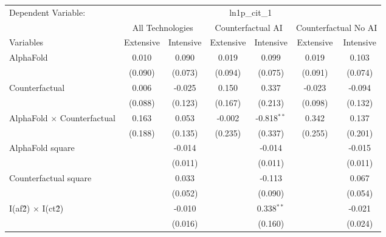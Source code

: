 \begingroup
\centering
\begin{tabular}{lcccccc}
   \tabularnewline \midrule \midrule
   Dependent Variable: & \multicolumn{6}{c}{ln1p\_cit\_1}\\
 & \multicolumn{2}{c}{All Technologies} & \multicolumn{2}{c}{Counterfactual AI} & \multicolumn{2}{c}{Counterfactual No AI} \\
\cmidrule(lr){1-1}\cmidrule(lr){2-3} \cmidrule(lr){4-5} \cmidrule(lr){6-7}
Variables & \multicolumn{1}{c}{Extensive} & \multicolumn{1}{c}{Intensive} & \multicolumn{1}{c}{Extensive} & \multicolumn{1}{c}{Intensive} & \multicolumn{1}{c}{Extensive} & \multicolumn{1}{c}{Intensive} \\
\cmidrule(lr){1-1}\cmidrule(lr){2-2} \cmidrule(lr){3-3} \cmidrule(lr){4-4} \cmidrule(lr){5-5} \cmidrule(lr){6-6} \cmidrule(lr){7-7}
   AlphaFold                          & 0.010   & 0.090   & 0.019   & 0.099         & 0.019   & 0.103\\   
                                      & (0.090) & (0.073) & (0.094) & (0.075)       & (0.091) & (0.074)\\   
   Counterfactual                     & 0.006   & -0.025  & 0.150   & 0.337         & -0.023  & -0.094\\   
                                      & (0.088) & (0.123) & (0.167) & (0.213)       & (0.098) & (0.132)\\   
   AlphaFold $\times$ Counterfactual  & 0.163   & 0.053   & -0.002  & -0.818$^{**}$ & 0.342   & 0.137\\   
                                      & (0.188) & (0.135) & (0.235) & (0.337)       & (0.255) & (0.201)\\   
   AlphaFold square                   &         & -0.014  &         & -0.014        &         & -0.015\\   
                                      &         & (0.011) &         & (0.011)       &         & (0.011)\\   
   Counterfactual square              &         & 0.033   &         & -0.113        &         & 0.067\\   
                                      &         & (0.052) &         & (0.090)       &         & (0.054)\\   
   I(af\^2) $\times$ I(ct\^2)         &         & -0.010  &         & 0.338$^{**}$  &         & -0.021\\   
                                      &         & (0.016) &         & (0.160)       &         & (0.024)\\   

\end{tabular}
